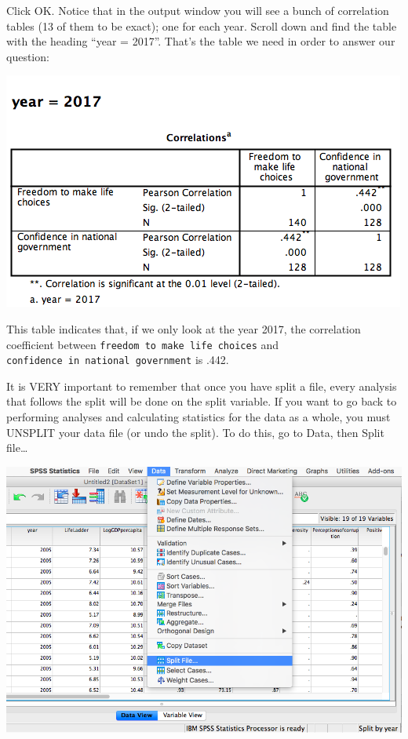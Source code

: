 \documentclass[
]{book}
\begin{document}
Click {OK}. Notice that in the output window you will see a bunch of correlation tables (13 of them to be exact); one for each year. Scroll down and find the table with the heading ``year = 2017''. That's the table we need in order to answer our question:

\includegraphics{img/3.4.34.png}

This table indicates that, if we only look at the year 2017, the correlation coefficient between \texttt{freedom\ to\ make\ life\ choices} and \texttt{confidence\ in\ national\ government} is .442.

It is VERY important to remember that once you have split a file, every analysis that follows the split will be done on the split variable. If you want to go back to performing analyses and calculating statistics for the data as a whole, you must UNSPLIT your data file (or undo the split). To do this, go to {Data}, then {Split file\ldots{}}

\includegraphics{img/3.4.35.png}
\end{document}
